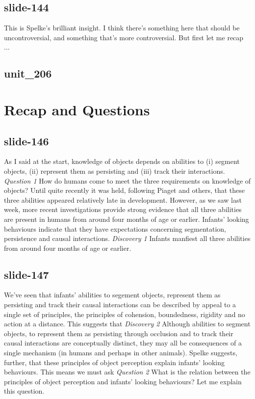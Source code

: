 \documentclass[12pt,\papersize]{extarticle}
\begin{document}
 
\subsection{slide-144}
This is Spelke's brilliant insight.
I think there's something here that should be uncontroversial, and something that's more controversial.
But first let me recap ...
 
 
\subsection{unit\_206}
 
\section{Recap and Questions}
 
 
\subsection{slide-146}
As I said at the start, knowledge of objects depends on abilities to (i) segment objects, (ii) represent them as persisting and (iii) track their interactions.
\emph{Question 1} How do humans come to meet the three requirements on knowledge of objects?
Until quite recently it was held, following Piaget and others, that these three abilities appeared relatively late in development.
However, as we saw last week, more recent investigations provide strong evidence that all three abilities are present in humans from around four months of age or earlier.
Infants' looking behaviours indicate that they have expectations concerning segmentation, persistence and causal interactions.
\emph{Discovery 1} Infants manfiest all three abilities from around four months of age or earlier.
 
 
\subsection{slide-147}
We've seen that infants' abilities to segement objects, represent them as persisting and track their causal interactions can be described by appeal to a single set of principles, the principles of cohension, boundedness, rigidity and no action at a distance.
This suggests that
\emph{Discovery 2} Although abilities to segment objects, to represent them as persisting through occlusion and to track their causal interactions are conceptually distinct, they may all be consequences of a single mechanism (in humans and perhaps in other animals).
Spelke suggests, further, that these principles of object perception explain infants' looking behaviours.
This means we must ask
\emph{Question 2} What is the relation between the principles of object perception and infants’ looking behaviours?
Let me explain this question.
 
\end{document}
